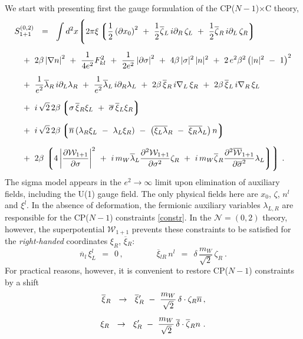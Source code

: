 \documentclass[12pt]{article}
\newcommand{\ntwoo}{${\mathcal N}= \left(0,2\right) $ }
\newcommand{\p}{\partial}
\newcommand{\ov}{\overline}
\newcommand{\mc}[1]{\mathcal{#1}}
\newcommand{\lgr}{\left\lgroup}
\newcommand{\rgr}{\right\rgroup}
\newcommand{\bxir}{\ov{\xi}{}_R}
\newcommand{\xir}{\xi_R}
\newcommand{\bzr}{\ov{\zeta}{}_R}
\newcommand{\nbar}{\ov{n}}
\newcommand{\CPC}{CP($N-1$)$\times$C }
\begin{document}
	We start with presenting first the gauge formulation of the \CPC theory,
\begin{align*}
%
	& S_{1+1}^{(0,2)} ~~=~~ \int d^2 x 
\Biggl \lgroup
	2\pi\xi \lgr \frac 1 2 \left (\p x_0\right)^2 ~+~
		      \frac 1 2 \ov{\zeta}{}_L\, i\p_R\, \zeta_L ~+~
			\frac 1 2 \ov {\zeta}{}_R\, i\p_L\, \zeta_R
		\rgr
	 \\[2mm]
%
&
	\;\;
	~+~
	2\beta \left| \nabla n \right|^2 ~+~ \frac{1}{4e^2} F_{kl}^2
			~+~ \frac{1}{2e^2} \left|\p \sigma\right|^2 ~+~
	4\beta\, |\sigma|^2\, |n|^2 ~+~
	2\, e^2\beta^2 \left( |n|^2 ~-~ 1 \right)^2 \\[2mm]
%
&
	\;\;
	~+~
	\frac{1}{e^2} \ov{\lambda}{}_R\, i\p_L \lambda_R ~+~
	\frac{1}{e^2} \ov{\lambda}{}_L\, i\p_R \lambda_L ~+~
	2\beta\, \ov{\xi}{}_R\, i\nabla_L\, \xi_R ~+~
	2\beta\, \ov{\xi}{}_L\, i\nabla_R\, \xi_L  \\[2mm]
%
&
	\;\;
	~+~
	i\,\sqrt{2}\,2\beta \lgr \sigma\, \ov{\xi}{}_R\xi_L ~+~ 
				\ov{\sigma}\,\ov{\xi}{}_L\xi_R \rgr  \\[2mm]
%
&
	\;\;
	~+~
	i\,\sqrt{2}\,2\beta 
		\lgr \ov{n} \left( \lambda_R \xi_L ~-~ \lambda_L\xi_R \right)
		~-~ \left( \ov{\xi_L\lambda}{}_R ~-~ \ov{\xi_R\lambda}{}_L \right) n \rgr 
	\\[2mm]
%
&	
	\;\;
	~+~
	2\beta\,
	\lgr 4 \left | \frac{\p \mc{W}_{1+1}}{\p\sigma} \right |^2 
		~+~ i\, m_W \ov{\lambda}_L \frac{\p^2 \mc{W}_{1+1}}{\p \sigma^2} \zeta_R 
	~+~ i\, m_W \ov{\zeta}{}_R \frac{\p^2 \ov{\mc{W}}{}_{1+1}}{\p\ov{\sigma}^2} \lambda_L 
	\rgr
	\Biggr \rgroup~.
\label{cpgf}
\end{align*}
	The sigma model appears in the $ e^2 \to \infty $ limit upon elimination of  auxiliary fields, 
	including the U(1) gauge field.
	The only physical fields here are $ x_0 $, $ \zeta $, $ n^l $ and $ \xi^l $.
	In the absence of deformation, the fermionic auxiliary variables $ \lambda_{L,R} $  are responsible for 
	the CP($N-1$) constraints \eqref{constr}.
	In the \ntwoo theory, however, the superpotential $ \mathcal{W}_{1+1} $ prevents these constraints to be satisfied
	 for the {\it right-handed} coordinates $ \xir $, $ \bxir $:
\[
	\nbar{}_l\, \xi_L^l ~~=~~ 0\,, \qquad\qquad  
	\ov{\xi}{}_{lR}\, n^l ~~=~~ \delta\, \frac{m_W}{\sqrt{2}}\, \zeta_R~.
\]
	For practical reasons, however, it is convenient to restore CP($N-1$) constraints by a shift
\begin{align}
%
\notag
	\bxir ~~\to~~ \bxir' ~-~ \frac{m_W}{\sqrt{2}}\, \delta \cdot \zeta_R\ov{n} \,,\\[2mm]
%
\label{shift}
	\xi_R ~~\to~~ \xi_R' ~-~ \frac{m_W}{\sqrt{2}}\, \ov{\delta} \cdot \bzr n~.
\end{align}
\end{document}
